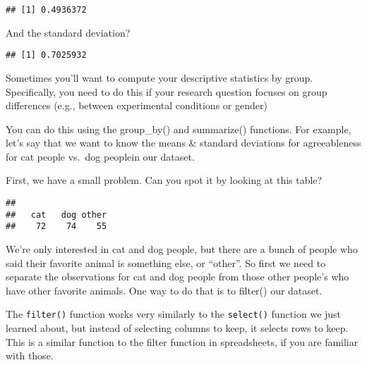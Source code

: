 \documentclass[
]{article}
\newenvironment{Shaded}{\begin{snugshade}}{\end{snugshade}}
\newcommand{\AttributeTok}[1]{\textcolor[rgb]{0.13,0.29,0.53}{#1}}
\newcommand{\ConstantTok}[1]{\textcolor[rgb]{0.56,0.35,0.01}{#1}}
\newcommand{\FunctionTok}[1]{\textcolor[rgb]{0.13,0.29,0.53}{\textbf{#1}}}
\newcommand{\NormalTok}[1]{#1}
\newcommand{\SpecialCharTok}[1]{\textcolor[rgb]{0.81,0.36,0.00}{\textbf{#1}}}
\begin{document}
\begin{verbatim}
## [1] 0.4936372
\end{verbatim}

And the standard deviation?

\begin{Shaded}
\end{Shaded}

\begin{verbatim}
## [1] 0.7025932
\end{verbatim}

Sometimes you'll want to compute your descriptive statistics by group.
Specifically, you need to do this if your research question focuses on
group differences (e.g., between experimental conditions or gender)

You can do this using the group\_by() and summarize() functions. For
example, let's say that we want to know the means \& standard deviations
for agreeableness for cat people vs.~dog peoplein our dataset.

First, we have a small problem. Can you spot it by looking at this
table?

\begin{Shaded}
\end{Shaded}

\begin{verbatim}
## 
##   cat   dog other 
##    72    74    55
\end{verbatim}

We're only interested in cat and dog people, but there are a bunch of
people who said their favorite animal is something else, or ``other''.
So first we need to separate the observations for cat and dog people
from those other people's who have other favorite animals. One way to do
that is to filter() our dataset.

The \texttt{filter()} function works very similarly to the
\texttt{select()} function we just learned about, but instead of
selecting columns to keep, it selects rows to keep. This is a similar
function to the filter function in spreadsheets, if you are familiar
with those.
\end{document}
